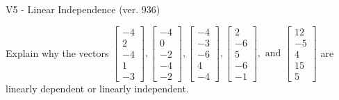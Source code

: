 \begin{exercise}
  \begin{exerciseTitle}V5 - Linear Independence (ver. 936)\end{exerciseTitle}
  \begin{exerciseStatement}
    Explain why the vectors \(\left[\begin{array}{r}
-4 \\
2 \\
-4 \\
1 \\
-3
\end{array}\right] , \left[\begin{array}{r}
-4 \\
0 \\
-2 \\
-4 \\
-2
\end{array}\right] , \left[\begin{array}{r}
-4 \\
-3 \\
-6 \\
4 \\
-4
\end{array}\right] , \left[\begin{array}{r}
2 \\
-6 \\
5 \\
-6 \\
-1
\end{array}\right] , \text{ and } \left[\begin{array}{r}
12 \\
-5 \\
4 \\
15 \\
5
\end{array}\right]\) are linearly dependent or linearly independent.	



\end{exerciseStatement}
\end{exercise}
